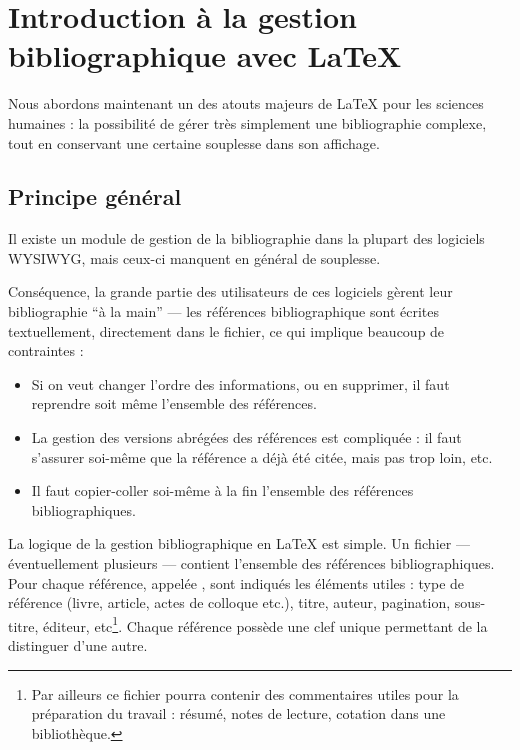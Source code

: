 \chapter[Introduction]{Introduction à la gestion bibliographique avec \LaTeX{}}
\begin{prealable}
Nous abordons maintenant un des atouts majeurs de \LaTeX{} pour les sciences humaines : la possibilité de gérer très simplement une bibliographie complexe, tout en conservant une certaine souplesse dans son affichage.

\end{prealable}
\section{Principe général}



Il existe un module de gestion de la bibliographie dans la plupart des logiciels WYSIWYG, mais ceux-ci manquent en général de souplesse.

Conséquence, la grande partie des utilisateurs de ces logiciels gèrent leur bibliographie \enquote{à la main} --- les références bibliographique sont écrites textuellement, directement dans le fichier, ce qui implique beaucoup de contraintes  :
\begin{itemize}
\item Si on veut changer l'ordre des informations, ou en supprimer, il faut reprendre soit même l'ensemble des références.
\item La gestion des versions abrégées des références est  compliquée :  il faut s'assurer soi-même que la référence a déjà été citée, mais pas trop loin, etc. 
\item Il faut copier-coller soi-même à la fin l'ensemble des références bibliographiques. 
\end{itemize}

La logique de la gestion bibliographique en \LaTeX{} est  simple. Un fichier   --- éventuellement plusieurs --- contient l'ensemble des références bibliographiques. Pour chaque référence, appelée , sont indiqués les éléments utiles :  type de référence (livre, article, actes de colloque etc.), titre, auteur, pagination, sous-titre, éditeur, etc\footnote{Par ailleurs ce fichier pourra contenir des commentaires utiles pour la préparation du travail : résumé, notes de lecture, cotation dans une bibliothèque.}. Chaque référence possède une clef unique permettant de la distinguer d'une autre.

